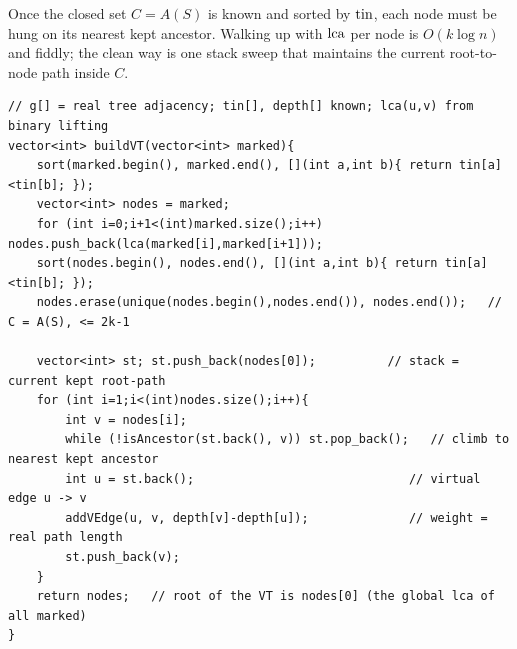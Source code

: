 Once the closed set \(C=A(S)\) is known and sorted by \(\operatorname{tin}\), each node must be
hung on its nearest kept ancestor.  Walking up with \(\operatorname{lca}\) per node is \(O(k\log
n)\) and fiddly; the clean way is one stack sweep that maintains the current
root-to-node path inside \(C\).

\begin{lstlisting}[caption={Build the virtual tree of a marked set. Input: marked nodes, and lca/tin from a preprocessing pass (Ch.16). Sort by tin, close under adjacent-pair lca, dedup, then a monotone stack links each node to its nearest kept ancestor. Edge weight = depth difference. ASCII only}, label={lst:c30-build}]
// g[] = real tree adjacency; tin[], depth[] known; lca(u,v) from binary lifting
vector<int> buildVT(vector<int> marked){
    sort(marked.begin(), marked.end(), [](int a,int b){ return tin[a]<tin[b]; });
    vector<int> nodes = marked;
    for (int i=0;i+1<(int)marked.size();i++) nodes.push_back(lca(marked[i],marked[i+1]));
    sort(nodes.begin(), nodes.end(), [](int a,int b){ return tin[a]<tin[b]; });
    nodes.erase(unique(nodes.begin(),nodes.end()), nodes.end());   // C = A(S), <= 2k-1

    vector<int> st; st.push_back(nodes[0]);          // stack = current kept root-path
    for (int i=1;i<(int)nodes.size();i++){
        int v = nodes[i];
        while (!isAncestor(st.back(), v)) st.pop_back();   // climb to nearest kept ancestor
        int u = st.back();                              // virtual edge u -> v
        addVEdge(u, v, depth[v]-depth[u]);              // weight = real path length
        st.push_back(v);
    }
    return nodes;   // root of the VT is nodes[0] (the global lca of all marked)
}
\end{lstlisting}

